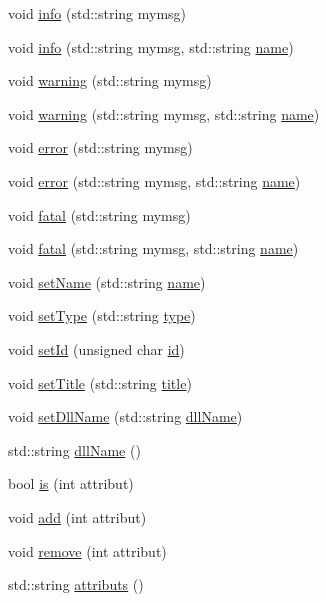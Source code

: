 \begin{DoxyCompactItemize}
\item 
void \hyperlink{classObject_a644fd329ea4cb85f54fa6846484b84a8}{info} (std\+::string mymsg)
\item 
void \hyperlink{classObject_a1ca123253dfd30fc28b156f521dcbdae}{info} (std\+::string mymsg, std\+::string \hyperlink{classObject_a300f4c05dd468c7bb8b3c968868443c1}{name})
\item 
void \hyperlink{classObject_a65cd4fda577711660821fd2cd5a3b4c9}{warning} (std\+::string mymsg)
\item 
void \hyperlink{classObject_a11f101db4dd73d9391b0231818881d86}{warning} (std\+::string mymsg, std\+::string \hyperlink{classObject_a300f4c05dd468c7bb8b3c968868443c1}{name})
\item 
void \hyperlink{classObject_a204a95f57818c0f811933917a30eff45}{error} (std\+::string mymsg)
\item 
void \hyperlink{classObject_ad7f6c457733082efa2f9ff5f5c8e119a}{error} (std\+::string mymsg, std\+::string \hyperlink{classObject_a300f4c05dd468c7bb8b3c968868443c1}{name})
\item 
void \hyperlink{classObject_aad5a16aac7516ce65bd5ec02ab07fc80}{fatal} (std\+::string mymsg)
\item 
void \hyperlink{classObject_ae62acd3d09f716220f75f252dc38bc9a}{fatal} (std\+::string mymsg, std\+::string \hyperlink{classObject_a300f4c05dd468c7bb8b3c968868443c1}{name})
\item 
void \hyperlink{classObject_ae30fea75683c2d149b6b6d17c09ecd0c}{set\+Name} (std\+::string \hyperlink{classObject_a300f4c05dd468c7bb8b3c968868443c1}{name})
\item 
void \hyperlink{classObject_aae534cc9d982bcb9b99fd505f2e103a5}{set\+Type} (std\+::string \hyperlink{classObject_a84f99f70f144a83e1582d1d0f84e4e62}{type})
\item 
void \hyperlink{classObject_a398fe08cba594a0ce6891d59fe4f159f}{set\+Id} (unsigned char \hyperlink{classObject_af99145335cc61ff6e2798ea17db009d2}{id})
\item 
void \hyperlink{classObject_a89557dbbad5bcaa02652f5d7fa35d20f}{set\+Title} (std\+::string \hyperlink{classObject_a73a0f1a41828fdd8303dd662446fb6c3}{title})
\item 
void \hyperlink{classObject_a870c5af919958c2136623b2d7816d123}{set\+Dll\+Name} (std\+::string \hyperlink{classObject_a2e3947f2870094c332d7454117f3ec63}{dll\+Name})
\item 
std\+::string \hyperlink{classObject_a2e3947f2870094c332d7454117f3ec63}{dll\+Name} ()
\item 
bool \hyperlink{classAttrib_a704f26af560909ad22065083bb7d4c34}{is} (int attribut)
\item 
void \hyperlink{classAttrib_a235f773af19c900264a190b00a3b4ad7}{add} (int attribut)
\item 
void \hyperlink{classAttrib_a7d4ef7e32d93cb287792b87b857e79f3}{remove} (int attribut)
\item 
std\+::string \hyperlink{classAttrib_aee7bbf16b144887f196e1341b24f8a26}{attributs} ()
\end{DoxyCompactItemize}
